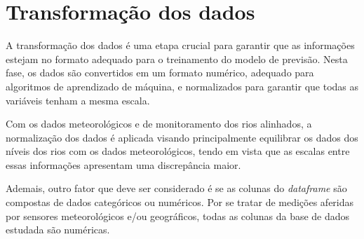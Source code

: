 \section{Transformação dos dados}

A transformação dos dados é uma etapa crucial para garantir que as informações estejam no formato adequado para o treinamento do modelo de previsão. Nesta fase, os dados são convertidos em um formato numérico, adequado para algoritmos de aprendizado de máquina, e normalizados para garantir que todas as variáveis tenham a mesma escala.

Com os dados meteorológicos e de monitoramento dos rios alinhados, a normalização dos dados é aplicada visando principalmente equilibrar os dados dos níveis dos rios com os dados meteorológicos, tendo em vista que as escalas entre essas informações apresentam uma discrepância maior.

Ademais, outro fator que deve ser considerado é se as colunas do \textit{dataframe} são compostas de dados categóricos ou numéricos. Por se tratar de medições aferidas por sensores meteorológicos e/ou geográficos, todas as colunas da base de dados estudada são numéricas.



